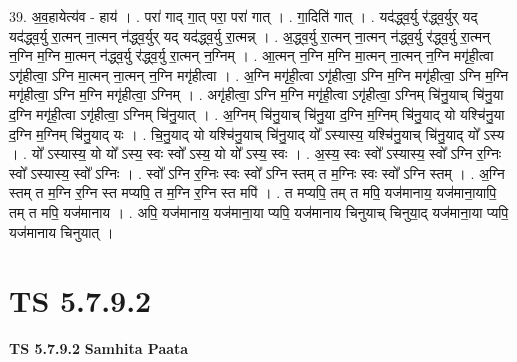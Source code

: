 \documentclass[17pt]{extarticle}
\begin{document}
39. अ॒व॒हायेत्य॑व - हाय॑ । . परा॑ गाद् गा॒त् परा॒ परा॑ गात् । . गा॒दिति॑ गात् । . यद॑द्ध्व॒र्यु र॑द्ध्व॒र्युर् यद् यद॑द्ध्व॒र्यु रा॒त्मन् ना॒त्मन् न॑द्ध्व॒र्युर् यद् यद॑द्ध्व॒र्यु रा॒त्मन्न् । . अ॒द्ध्व॒र्यु रा॒त्मन् ना॒त्मन् न॑द्ध्व॒र्यु र॑द्ध्व॒र्यु रा॒त्मन् न॒ग्नि म॒ग्नि मा॒त्मन् न॑द्ध्व॒र्यु र॑द्ध्व॒र्यु रा॒त्मन् न॒ग्निम् । . आ॒त्मन् न॒ग्नि म॒ग्नि मा॒त्मन् ना॒त्मन् न॒ग्नि मगृ॑ही॒त्वा ऽगृ॑हीत्वा॒ ऽग्नि मा॒त्मन् ना॒त्मन् न॒ग्नि मगृ॑हीत्वा । . अ॒ग्नि मगृ॑ही॒त्वा ऽगृ॑हीत्वा॒ ऽग्नि म॒ग्नि मगृ॑हीत्वा॒ ऽग्नि म॒ग्नि मगृ॑हीत्वा॒ ऽग्नि म॒ग्नि मगृ॑हीत्वा॒ ऽग्निम् । . अगृ॑हीत्वा॒ ऽग्नि म॒ग्नि मगृ॑ही॒त्वा ऽगृ॑हीत्वा॒ ऽग्निम् चि॑नु॒याच् चि॑नु॒या द॒ग्नि मगृ॑ही॒त्वा ऽगृ॑हीत्वा॒ ऽग्निम् चि॑नु॒यात् । . अ॒ग्निम् चि॑नु॒याच् चि॑नु॒या द॒ग्नि म॒ग्निम् चि॑नु॒याद् यो यश्चि॑नु॒या द॒ग्नि म॒ग्निम् चि॑नु॒याद् यः । . चि॒नु॒याद् यो यश्चि॑नु॒याच् चि॑नु॒याद् यो᳚ ऽस्यास्य॒ यश्चि॑नु॒याच् चि॑नु॒याद् यो᳚ ऽस्य । . यो᳚ ऽस्यास्य॒ यो यो᳚ ऽस्य॒ स्वः स्वो᳚ ऽस्य॒ यो यो᳚ ऽस्य॒ स्वः । . अ॒स्य॒ स्वः स्वो᳚ ऽस्यास्य॒ स्वो᳚ ऽग्नि र॒ग्निः स्वो᳚ ऽस्यास्य॒ स्वो᳚ ऽग्निः । . स्वो᳚ ऽग्नि र॒ग्निः स्वः स्वो᳚ ऽग्नि स्तम् त म॒ग्निः स्वः स्वो᳚ ऽग्नि स्तम् । . अ॒ग्नि स्तम् त म॒ग्नि र॒ग्नि स्त मप्यपि॒ त म॒ग्नि र॒ग्नि स्त मपि॑ । . त मप्यपि॒ तम् त मपि॒ यज॑मानाय॒ यज॑माना॒यापि॒ तम् त मपि॒ यज॑मानाय । . अपि॒ यज॑मानाय॒ यज॑माना॒या प्यपि॒ यज॑मानाय चिनुयाच् चिनुया॒द् यज॑माना॒या प्यपि॒ यज॑मानाय चिनुयात् । \newline
\pagebreak
{}

\section{ TS 5.7.9.2 }

\textbf{TS 5.7.9.2 } \newline
\textbf{Samhita Paata} \newline
\end{document}
